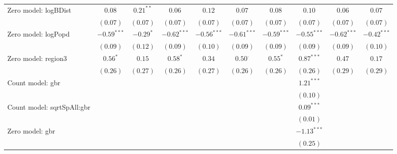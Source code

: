 \begin{sidewaystable}
\begin{center}
{\begin{tabular}{l c c c c c c c c c}
Zero model: logBDist           & $0.08$        & $0.21^{**}$   & $0.06$        & $0.12$        & $0.07$         & $0.08$        & $0.10$        & $0.06$         & $0.07$         \\
                               & $(0.07)$      & $(0.07)$      & $(0.07)$      & $(0.07)$      & $(0.07)$       & $(0.07)$      & $(0.07)$      & $(0.07)$       & $(0.07)$       \\
Zero model: logPopd            & $-0.59^{***}$ & $-0.29^{*}$   & $-0.62^{***}$ & $-0.56^{***}$ & $-0.61^{***}$  & $-0.59^{***}$ & $-0.55^{***}$ & $-0.62^{***}$  & $-0.42^{***}$  \\
                               & $(0.09)$      & $(0.12)$      & $(0.09)$      & $(0.10)$      & $(0.09)$       & $(0.09)$      & $(0.09)$      & $(0.09)$       & $(0.10)$       \\
Zero model: region3            & $0.56^{*}$    & $0.15$        & $0.58^{*}$    & $0.34$        & $0.50^{\cdot}$ & $0.55^{*}$    & $0.87^{***}$  & $0.47$         & $0.17$         \\
                               & $(0.26)$      & $(0.27)$      & $(0.26)$      & $(0.27)$      & $(0.26)$       & $(0.26)$      & $(0.26)$      & $(0.29)$       & $(0.29)$       \\
Count model: gbr               &               &               &               &               &                &               & $1.21^{***}$  &                &                \\
                               &               &               &               &               &                &               & $(0.10)$      &                &                \\
Count model: sqrtSpAll:gbr     &               &               &               &               &                &               & $0.09^{***}$  &                &                \\
                               &               &               &               &               &                &               & $(0.01)$      &                &                \\
Zero model: gbr                &               &               &               &               &                &               & $-1.13^{***}$ &                &                \\
                               &               &               &               &               &                &               & $(0.25)$      &                &                \\

\end{tabular}}
\end{center}
\end{sidewaystable}
